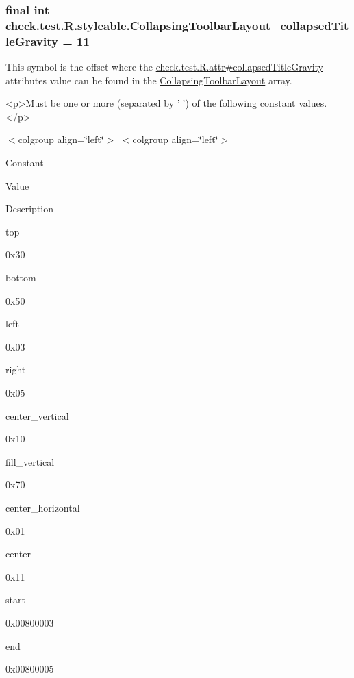 \subsubsection[{Collapsing\+Toolbar\+Layout\+\_\+collapsed\+Title\+Gravity}]{\setlength{\rightskip}{0pt plus 5cm}final int check.\+test.\+R.\+styleable.\+Collapsing\+Toolbar\+Layout\+\_\+collapsed\+Title\+Gravity = 11\hspace{0.3cm}{\ttfamily [static]}}\label{classcheck_1_1test_1_1_r_1_1styleable_ad728b1cdc0cf8cb71ec337342515dd75}
This symbol is the offset where the \hyperlink{classcheck_1_1test_1_1_r_1_1attr_a9e98ef24c71f088c89ee2b106577575f}{check.\+test.\+R.\+attr\#collapsed\+Title\+Gravity} attribute\textquotesingle{}s value can be found in the \hyperlink{classcheck_1_1test_1_1_r_1_1styleable_a0c512120c75d0ddac20063034a72db17}{Collapsing\+Toolbar\+Layout} array.

\begin{DoxyVerb}      <p>Must be one or more (separated by '|') of the following constant values.</p>
\end{DoxyVerb}
 \begin{TabularC}{0}
\hline
\end{TabularC}
$<$colgroup align=\char`\"{}left\char`\"{}$>$ $<$colgroup align=\char`\"{}left\char`\"{}$>$ 

Constant

Value

Description 

{\ttfamily top}

0x30

{\ttfamily bottom}

0x50

{\ttfamily left}

0x03

{\ttfamily right}

0x05

{\ttfamily center\+\_\+vertical}

0x10

{\ttfamily fill\+\_\+vertical}

0x70

{\ttfamily center\+\_\+horizontal}

0x01

{\ttfamily center}

0x11

{\ttfamily start}

0x00800003

{\ttfamily end}

0x00800005

